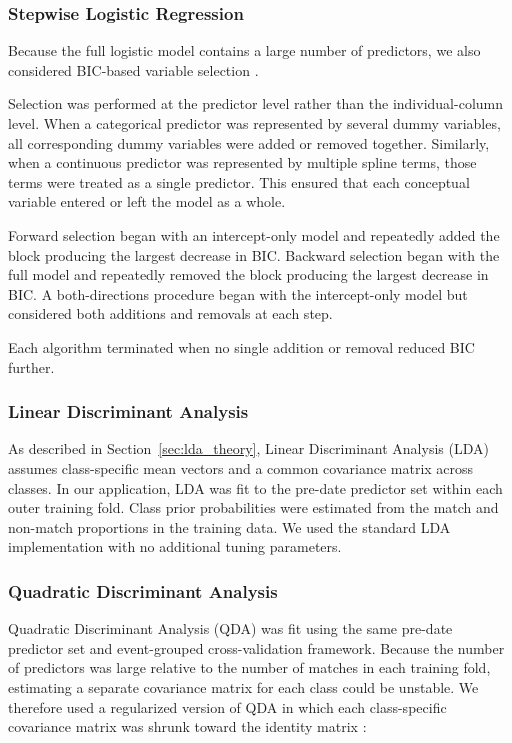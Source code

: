 \subsubsection{Stepwise Logistic Regression}

Because the full logistic model contains a large number of predictors, we also considered BIC-based variable selection \cite[Section 6.1.2, pp.~233--235]{James:2023}.

Selection was performed at the predictor level rather than the individual-column level. When a categorical predictor was represented by several dummy variables, all corresponding dummy variables were added or removed together. Similarly, when a continuous predictor was represented by multiple spline terms, those terms were treated as a single predictor. This ensured that each conceptual variable entered or left the model as a whole.

Forward selection began with an intercept-only model and repeatedly added the block producing the largest decrease in BIC. Backward selection began with the full model and repeatedly removed the block producing the largest decrease in BIC. A both-directions procedure began with the intercept-only model but considered both additions and removals at each step.

Each algorithm terminated when no single addition or removal reduced BIC further.

\subsubsection{Linear Discriminant Analysis}

As described in Section~\ref{sec:lda_theory}, Linear Discriminant Analysis (LDA) assumes class-specific mean vectors and a common covariance matrix across classes. In our application, LDA was fit to the pre-date predictor set within each outer training fold. Class prior probabilities were estimated from the match and non-match proportions in the training data. We used the standard LDA implementation with no additional tuning parameters.

\subsubsection{Quadratic Discriminant Analysis}

Quadratic Discriminant Analysis (QDA) was fit using the same pre-date predictor set and event-grouped cross-validation framework. Because the number of predictors was large relative to the number of matches in each training fold, estimating a separate covariance matrix for each class could be unstable. We therefore used a regularized version of QDA \cite{Friedman:1989} in which each class-specific covariance matrix was shrunk toward the identity matrix \cite[Section 4.3.1, Eq.~(4.14), p.~112]{Hastie:2009}:

